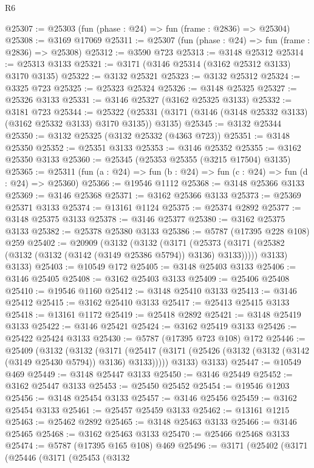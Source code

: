 \begin{lexlean}{R6}
\begin{coremodule}
@25307 := @25303 (fun (phase : @24) => fun (frame : @2836) => @25304)
@25308 := @3169 @17069
@25311 := @25307 (fun (phase : @24) => fun (frame : @2836) => @25308)
@25312 := @3590 @723
@25313 := @3148 @25312
@25314 := @25313 @3133
@25321 := @3171 (@3146 @25314 (@3162 @25312 @3133) @3170 @3135)
@25322 := @3132 @25321
@25323 := @3132 @25312
@25324 := @3325 @723
@25325 := @25323 @25324
@25326 := @3148 @25325
@25327 := @25326 @3133
@25331 := @3146 @25327 (@3162 @25325 @3133)
@25332 := @3181 @723
@25344 := @25322
    (@25331 (@3171 (@3146 (@3148 @25332 @3133) (@3162 @25332 @3133) @3170 @3135)) @3135)
@25345 := @3132 @25344
@25350 := @3132 @25325 (@3132 @25332 (@4363 @723))
@25351 := @3148 @25350
@25352 := @25351 @3133
@25353 := @3146 @25352
@25355 := @3162 @25350 @3133
@25360 := @25345 (@25353 @25355 (@3215 @17504) @3135)
@25365 := @25311 (fun (a : @24) => fun (b : @24) => fun (c : @24) => fun (d : @24) => @25360)
@25366 := @19546 @1112
@25368 := @3148 @25366 @3133
@25369 := @3146 @25368
@25371 := @3162 @25366 @3133
@25373 := @25369 @25371 @3133
@25374 := @13161 @1124
@25375 := @25374 @2892
@25377 := @3148 @25375 @3133
@25378 := @3146 @25377
@25380 := @3162 @25375 @3133
@25382 := @25378 @25380 @3133
@25386 := @5787 (@17395 @228 @108) @259
@25402 := @20909
    (@3132
      (@3132
        (@3171 (@25373 (@3171 (@25382 (@3132 (@3132 (@3142 (@3149 @25386 @5794)) @3136) @3133)))))
        @3133)
      @3133)
@25403 := @10549 @172
@25405 := @3148 @25403 @3133
@25406 := @3146 @25405
@25408 := @3162 @25403 @3133
@25409 := @25406 @25408
@25410 := @19546 @1160
@25412 := @3148 @25410 @3133
@25413 := @3146 @25412
@25415 := @3162 @25410 @3133
@25417 := @25413 @25415 @3133
@25418 := @13161 @1172
@25419 := @25418 @2892
@25421 := @3148 @25419 @3133
@25422 := @3146 @25421
@25424 := @3162 @25419 @3133
@25426 := @25422 @25424 @3133
@25430 := @5787 (@17395 @723 @108) @172
@25446 := @25409
    (@3132
      (@3132
        (@3171 (@25417 (@3171 (@25426 (@3132 (@3132 (@3142 (@3149 @25430 @5794)) @3136) @3133)))))
        @3133)
      @3133)
@25447 := @10549 @469
@25449 := @3148 @25447 @3133
@25450 := @3146 @25449
@25452 := @3162 @25447 @3133
@25453 := @25450 @25452
@25454 := @19546 @1203
@25456 := @3148 @25454 @3133
@25457 := @3146 @25456
@25459 := @3162 @25454 @3133
@25461 := @25457 @25459 @3133
@25462 := @13161 @1215
@25463 := @25462 @2892
@25465 := @3148 @25463 @3133
@25466 := @3146 @25465
@25468 := @3162 @25463 @3133
@25470 := @25466 @25468 @3133
@25474 := @5787 (@17395 @165 @108) @469
@25496 := @3171
    (@25402
      (@3171
        (@25446
          (@3171
            (@25453
              (@3132

\end{coremodule}
\end{lexlean}
